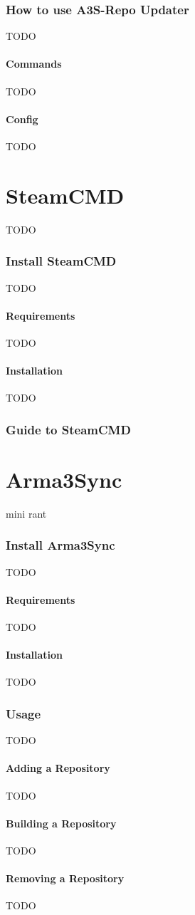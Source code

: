 \documentclass[a4paper]{article}
\begin{document}
		\section{How to use A3S-Repo Updater}
			TODO
			\subsection{Commands}
				TODO
			\subsection{Config}
				TODO
	\newpage
	
	\part{SteamCMD}
		TODO
		\section{Install SteamCMD}
			TODO
			\subsection{Requirements}
				TODO
			\subsection{Installation}
				TODO
		\section{Guide to SteamCMD}
	\newpage
	
	\part{Arma3Sync}
		mini rant
		\section{Install Arma3Sync}
			TODO
			\subsection{Requirements}
				TODO
			\subsection{Installation}
				TODO
		\section{Usage}
			TODO
			\subsection{Adding a Repository}
				TODO
			\subsection{Building a Repository}
				TODO
			\subsection{Removing a Repository}
				TODO
\end{document}
